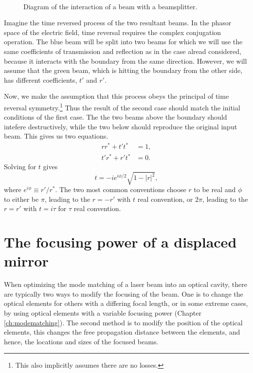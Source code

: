 \begin{figure}
  \begin{center}
  \leavevmode
  ~
  \end{center}
  \caption{Diagram of the interaction of a beam with a beamsplitter.}
  \label{fig:mrfig}
\end{figure}

Imagine the time reversed process of the two resultant beams. %
In the phasor space of the electric field, time reversal requires the complex conjugation operation. %
The blue beam will be split into two beams for which we will use the same coefficients of transmission and reflection as in the case alread considered, because it interacts with the boundary from the same direction. %
However, we will assume that the green beam, which is hitting the boundary from the other side, has different coefficients, $t'$ and $r'$.


Now, we make the assumption that this process obeys the principal of time reversal symmetry.\footnote{This also implicitly assumes there are no losses.} Thus the result of the second case should match the initial conditions of the first case. %
The the two beams above the boundary should intefere destructively, while the two below should reproduce the original input beam. %
This gives us two equations.
\begin{align*}
rr^*+t't^*&=1,\\
t'r^*+r't^*&=0.
\end{align*}
Solving for $t$ gives
\begin{equation}
t=-ie^{i\phi/2}\sqrt{1-|r|^2},
\end{equation}
where $e^{i\phi}\equiv r'/r^*$. %
The two most common conventions choose $r$ to be real and $\phi$ to either be $\pi$, leading to the $r=-r'$ with $t$ real convention, or $2\pi$, leading to the $r=r'$ with $t=i\tau$ for $\tau$ real convention.

\section{The focusing power of a displaced mirror}
When optimizing the mode matching of a laser beam into an optical cavity, there are typically two ways to modify the focusing of the beam. %
One is to change the optical elements for others with a differing focal length, or in some extreme cases, by using optical elements with a variable focusing power (Chapter \ref{ch:modematching}). %
The second method is to modify the position of the optical elements, this changes the free propagation distance between the elements, and hence, the locations and sizes of the focused beams.

